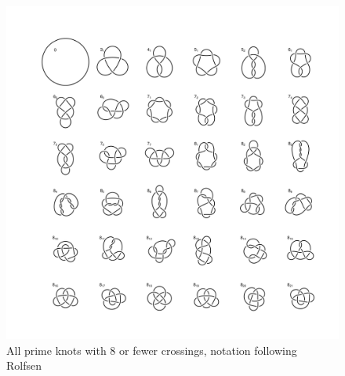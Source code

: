 \documentclass{birkjour}
\theoremstyle{definition}
\theoremstyle{remark}
\numberwithin{equation}{section}
\begin{document}
\begin{figure}[htbp]
  \begin{center}
\includegraphics[width=13cm]{knots_to_8crossings}  %
\caption{All \label{all8} prime knots with 8 or fewer crossings,
notation following Rolfsen~\cite{rolfsen1976}}
  \end{center}
\end{figure}




\end{document}
